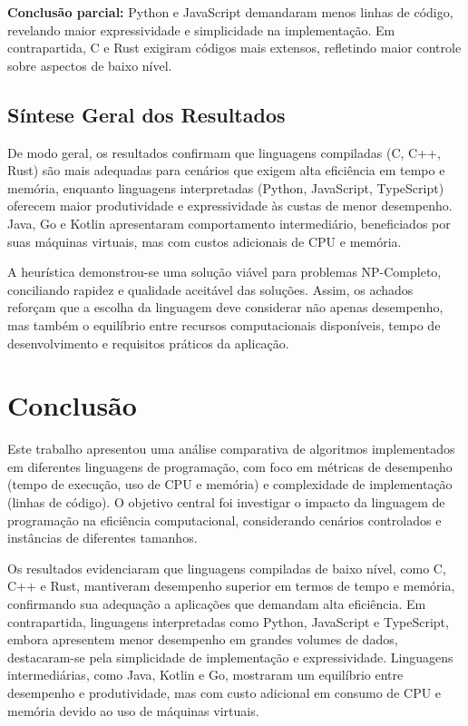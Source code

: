 \documentclass[12pt, a4paper]{article}
\begin{document}
\textbf{Conclusão parcial:} Python e JavaScript demandaram menos linhas de código, revelando maior expressividade e simplicidade na implementação. Em contrapartida, C e Rust exigiram códigos mais extensos, refletindo maior controle sobre aspectos de baixo nível.

\vspace{0.3cm}
\subsection{Síntese Geral dos Resultados}

De modo geral, os resultados confirmam que linguagens compiladas (C, C++, Rust) são mais adequadas para cenários que exigem alta eficiência em tempo e memória, enquanto linguagens interpretadas (Python, JavaScript, TypeScript) oferecem maior produtividade e expressividade às custas de menor desempenho. Java, Go e Kotlin apresentaram comportamento intermediário, beneficiados por suas máquinas virtuais, mas com custos adicionais de CPU e memória. 

A heurística demonstrou-se uma solução viável para problemas NP-Completo, conciliando rapidez e qualidade aceitável das soluções. Assim, os achados reforçam que a escolha da linguagem deve considerar não apenas desempenho, mas também o equilíbrio entre recursos computacionais disponíveis, tempo de desenvolvimento e requisitos práticos da aplicação.


\section{Conclusão}
Este trabalho apresentou uma análise comparativa de algoritmos implementados em diferentes linguagens de programação, com foco em métricas de desempenho (tempo de execução, uso de CPU e memória) e complexidade de implementação (linhas de código). O objetivo central foi investigar o impacto da linguagem de programação na eficiência computacional, considerando cenários controlados e instâncias de diferentes tamanhos.

Os resultados evidenciaram que linguagens compiladas de baixo nível, como C, C++ e Rust, mantiveram desempenho superior em termos de tempo e memória, confirmando sua adequação a aplicações que demandam alta eficiência. Em contrapartida, linguagens interpretadas como Python, JavaScript e TypeScript, embora apresentem menor desempenho em grandes volumes de dados, destacaram-se pela simplicidade de implementação e expressividade. Linguagens intermediárias, como Java, Kotlin e Go, mostraram um equilíbrio entre desempenho e produtividade, mas com custo adicional em consumo de CPU e memória devido ao uso de máquinas virtuais.
\end{document}
